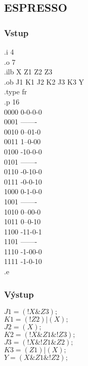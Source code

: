 \documentclass{article}
\begin{document}
\subsection{ESPRESSO}
\subsubsection{Vstup}
\begin{multicols}{2}
\noindent
.i 4\\
.o 7\\
.ilb X Z1 Z2 Z3\\
.ob J1 K1 J2 K2 J3 K3 Y\\
.type fr\\
.p 16\\
0000 0-0-0-0\\
0001 -------\\
0010 0--01-0\\
0011 1--0-00\\
0100 -10-0-0\\
0101 -------\\
0110 -0-10-0\\
0111 -0-0-10\\
1000 0-1-0-0\\
1001 -------\\
1010 0--00-0\\
1011 0--0-10\\
1100 -11-0-1\\
1101 -------\\
1110 -1-00-0\\
1111 -1-0-10\\
.e\\

\end{multicols}
\subsubsection{Výstup}
$J1 = (!X\&Z3);$\\
$K1 = (!Z2) | (X);$\\
$J2 = (X);$\\
$K2 = (!X\&Z1\&!Z3);$\\
$J3 = (!X\&!Z1\&Z2);$\\
$K3 = (Z1) | (X);$\\
$Y = (X\&Z1\&!Z2);$\\
\end{document}
